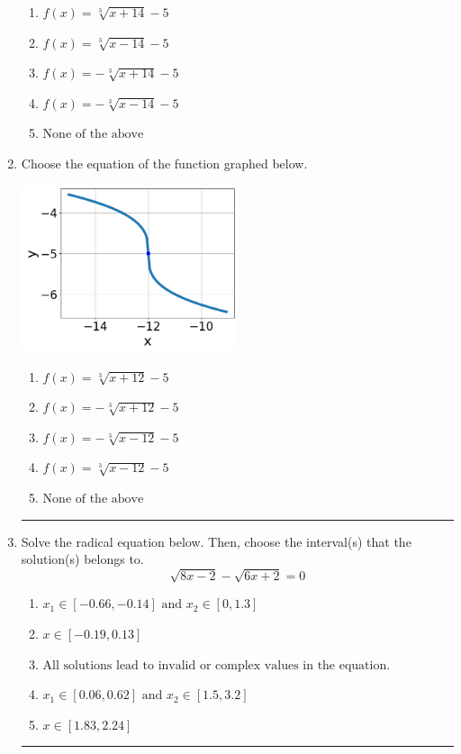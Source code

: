 \documentclass[14pt]{extbook}
\newcommand{\litem}[1]{\item#1\hspace*{-1cm}\rule{\textwidth}{0.4pt}}
\begin{document}
\begin{enumerate}
{\begin{center}
\end{center}
\begin{enumerate}[label=\Alph*.]
\item \( f(x) = \sqrt[3]{x + 14} - 5 \)
\item \( f(x) = \sqrt[3]{x - 14} - 5 \)
\item \( f(x) = - \sqrt[3]{x + 14} - 5 \)
\item \( f(x) = - \sqrt[3]{x - 14} - 5 \)
\item \( \text{None of the above} \)

\end{enumerate} }
\litem{
Choose the equation of the function graphed below.
\begin{center}
    \includegraphics[width=0.5\textwidth]{../Figures/radicalGraphToEquationCopyA.png}
\end{center}
\begin{enumerate}[label=\Alph*.]
\item \( f(x) = \sqrt[3]{x + 12} - 5 \)
\item \( f(x) = - \sqrt[3]{x + 12} - 5 \)
\item \( f(x) = - \sqrt[3]{x - 12} - 5 \)
\item \( f(x) = \sqrt[3]{x - 12} - 5 \)
\item \( \text{None of the above} \)

\end{enumerate} }
\litem{
Solve the radical equation below. Then, choose the interval(s) that the solution(s) belongs to.\[ \sqrt{8 x - 2} - \sqrt{6 x + 2} = 0 \]\begin{enumerate}[label=\Alph*.]
\item \( x_1 \in [-0.66, -0.14] \text{ and } x_2 \in [0,1.3] \)
\item \( x \in [-0.19,0.13] \)
\item \( \text{All solutions lead to invalid or complex values in the equation.} \)
\item \( x_1 \in [0.06, 0.62] \text{ and } x_2 \in [1.5,3.2] \)
\item \( x \in [1.83,2.24] \)


\end{enumerate}}
\end{enumerate}
\end{document}
